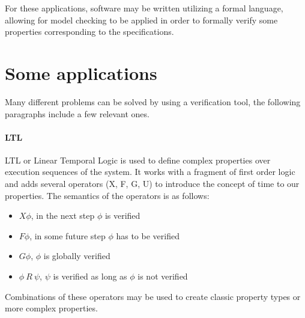For these applications, software may be written utilizing a formal language, allowing for model checking to be applied in order to formally verify some properties corresponding to the specifications.

\section{Some applications}
Many different problems can be solved by using a verification tool, the following paragraphs include a few relevant ones.

\paragraph*{LTL} LTL or Linear Temporal Logic is used to define complex properties over execution sequences of the system.
It works with a fragment of first order logic and adds several operators (X, F, G, U) to introduce the concept of time to our properties.
The semantics of the operators is as follows:
\begin{itemize}
    \item \begin{math} X \phi \end{math}, in the next step \begin{math} \phi \end{math} is verified
    \item \begin{math} F \phi \end{math}, in some future step \begin{math} \phi \end{math} has to be verified
    \item \begin{math} G \phi \end{math}, \begin{math} \phi \end{math} is globally verified
    \item \begin{math} \phi\ R\ \psi \end{math}, \begin{math} \psi \end{math} is verified as long as \begin{math} \phi \end{math} is not verified
\end{itemize}

Combinations of these operators may be used to create classic property types or more complex properties.

